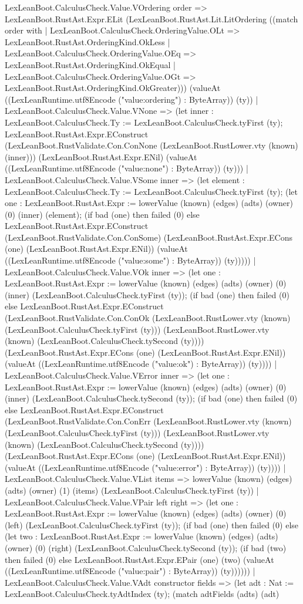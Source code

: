 \documentclass[11pt]{article}
\begin{document}
LexLeanBoot.CalculusCheck.Value.VOrdering order => LexLeanBoot.RustAst.Expr.ELit (LexLeanBoot.RustAst.Lit.LitOrdering ((match order with | LexLeanBoot.CalculusCheck.OrderingValue.OLt => LexLeanBoot.RustAst.OrderingKind.OkLess | LexLeanBoot.CalculusCheck.OrderingValue.OEq => LexLeanBoot.RustAst.OrderingKind.OkEqual | LexLeanBoot.CalculusCheck.OrderingValue.OGt => LexLeanBoot.RustAst.OrderingKind.OkGreater))) (valueAt ((LexLeanRuntime.utf8Encode ("value:ordering") : ByteArray)) (ty)) | LexLeanBoot.CalculusCheck.Value.VNone => (let inner : LexLeanBoot.CalculusCheck.Ty := LexLeanBoot.CalculusCheck.tyFirst (ty); LexLeanBoot.RustAst.Expr.EConstruct (LexLeanBoot.RustValidate.Con.ConNone (LexLeanBoot.RustLower.vty (known) (inner))) (LexLeanBoot.RustAst.Expr.ENil) (valueAt ((LexLeanRuntime.utf8Encode ("value:none") : ByteArray)) (ty))) | LexLeanBoot.CalculusCheck.Value.VSome inner => (let element : LexLeanBoot.CalculusCheck.Ty := LexLeanBoot.CalculusCheck.tyFirst (ty); (let one : LexLeanBoot.RustAst.Expr := lowerValue (known) (edges) (adts) (owner) (0) (inner) (element); (if bad (one) then failed (0) else LexLeanBoot.RustAst.Expr.EConstruct (LexLeanBoot.RustValidate.Con.ConSome) (LexLeanBoot.RustAst.Expr.ECons (one) (LexLeanBoot.RustAst.Expr.ENil)) (valueAt ((LexLeanRuntime.utf8Encode ("value:some") : ByteArray)) (ty))))) | LexLeanBoot.CalculusCheck.Value.VOk inner => (let one : LexLeanBoot.RustAst.Expr := lowerValue (known) (edges) (adts) (owner) (0) (inner) (LexLeanBoot.CalculusCheck.tyFirst (ty)); (if bad (one) then failed (0) else LexLeanBoot.RustAst.Expr.EConstruct (LexLeanBoot.RustValidate.Con.ConOk (LexLeanBoot.RustLower.vty (known) (LexLeanBoot.CalculusCheck.tyFirst (ty))) (LexLeanBoot.RustLower.vty (known) (LexLeanBoot.CalculusCheck.tySecond (ty)))) (LexLeanBoot.RustAst.Expr.ECons (one) (LexLeanBoot.RustAst.Expr.ENil)) (valueAt ((LexLeanRuntime.utf8Encode ("value:ok") : ByteArray)) (ty)))) | LexLeanBoot.CalculusCheck.Value.VError inner => (let one : LexLeanBoot.RustAst.Expr := lowerValue (known) (edges) (adts) (owner) (0) (inner) (LexLeanBoot.CalculusCheck.tySecond (ty)); (if bad (one) then failed (0) else LexLeanBoot.RustAst.Expr.EConstruct (LexLeanBoot.RustValidate.Con.ConErr (LexLeanBoot.RustLower.vty (known) (LexLeanBoot.CalculusCheck.tyFirst (ty))) (LexLeanBoot.RustLower.vty (known) (LexLeanBoot.CalculusCheck.tySecond (ty)))) (LexLeanBoot.RustAst.Expr.ECons (one) (LexLeanBoot.RustAst.Expr.ENil)) (valueAt ((LexLeanRuntime.utf8Encode ("value:error") : ByteArray)) (ty)))) | LexLeanBoot.CalculusCheck.Value.VList items => lowerValue (known) (edges) (adts) (owner) (1) (items) (LexLeanBoot.CalculusCheck.tyFirst (ty)) | LexLeanBoot.CalculusCheck.Value.VPair left right => (let one : LexLeanBoot.RustAst.Expr := lowerValue (known) (edges) (adts) (owner) (0) (left) (LexLeanBoot.CalculusCheck.tyFirst (ty)); (if bad (one) then failed (0) else (let two : LexLeanBoot.RustAst.Expr := lowerValue (known) (edges) (adts) (owner) (0) (right) (LexLeanBoot.CalculusCheck.tySecond (ty)); (if bad (two) then failed (0) else LexLeanBoot.RustAst.Expr.EPair (one) (two) (valueAt ((LexLeanRuntime.utf8Encode ("value:pair") : ByteArray)) (ty)))))) | LexLeanBoot.CalculusCheck.Value.VAdt constructor fields => (let adt : Nat := LexLeanBoot.CalculusCheck.tyAdtIndex (ty); (match adtFields (adts) (adt) 
\end{document}
